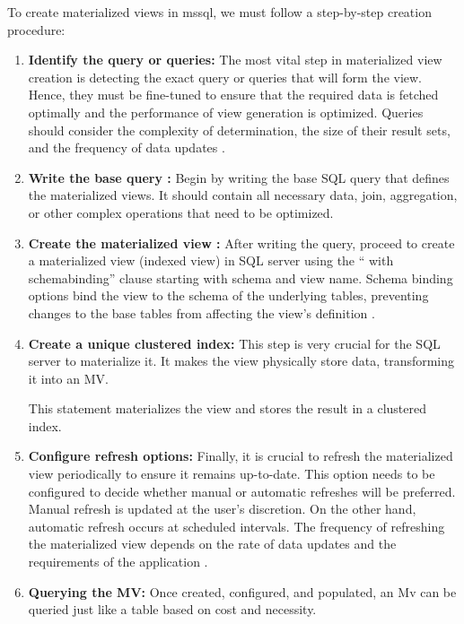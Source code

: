  To create materialized views in mssql, we must follow a step-by-step creation procedure:
 \begin{enumerate}
     

     \item\textbf{Identify the query or queries:} The most vital step in materialized view creation is detecting the exact query or queries that will form the view. Hence, they must be fine-tuned to ensure that the required data is fetched optimally and the performance of view generation is optimized. Queries should consider the complexity of determination, the size of their result sets, and the frequency of data updates \cite{castordoc2023}.
     
      \item\textbf{ Write the base query :} Begin by writing the base  SQL query that defines the materialized views. It should contain all necessary data, join, aggregation, or other complex operations that need to be optimized. \vspace{0.4cm}
      
      
      \item\textbf{ Create the materialized view :} After writing the query, proceed to create a materialized view (indexed view) in SQL server using the `` with schemabinding'' clause starting with schema and view name. Schema binding options bind the view to the schema of the underlying tables, preventing changes to the base tables from affecting the view's definition \cite{risingwave2024}.\vspace{0.4cm}

      

      \item\textbf{ Create a unique clustered index:} This step is very crucial for the SQL server to materialize it. It makes the view physically store data, transforming it into an MV. \vspace{0.4cm}
      
       

This statement materializes the view and stores the result in a clustered index.
      
      \item\textbf{ Configure refresh options:} Finally, it is crucial to refresh the materialized view periodically to ensure it remains up-to-date. This option needs to be configured to decide whether manual or automatic refreshes will be preferred. Manual refresh is updated at the user's discretion. On the other hand, automatic refresh occurs at scheduled intervals. The frequency of refreshing the materialized view depends on the rate of data updates and the requirements of the application \cite{castordoc2023}.\vspace{0.4cm}
      
      \item\textbf{ Querying the MV:} Once created, configured, and populated, an Mv can be queried just like a table based on cost and necessity.  \vspace{0.4cm}
      

\end{enumerate}

